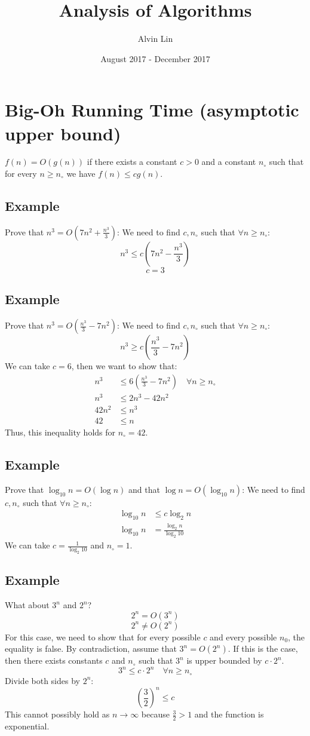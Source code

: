 \documentclass[letterpaper, 12pt]{math}
\title{Analysis of Algorithms}
\author{Alvin Lin}
\date{August 2017 - December 2017}
\begin{document}
\maketitle

\section*{Big-Oh Running Time (asymptotic upper bound)}
\( f(n) = O(g(n)) \) if there exists a constant \( c > 0 \) and a constant
\( n_{\circ} \) such that for every \( n\geq n_{\circ} \) we have
\( f(n)\leq cg(n) \).

\subsection*{Example}
Prove that \( n^3 = O(7n^2+\frac{n^3}{3}) \):
We need to find \( c,n_{\circ} \) such that \( \forall n\geq n_{\circ} \):
\[ n^3\leq c(7n^2-\frac{n^3}{3}) \]
\[ c = 3 \]

\subsection*{Example}
Prove that \( n^3 = O(\frac{n^3}{3}-7n^2) \):
We need to find \( c,n_{\circ} \) such that \( \forall n\geq n_{\circ} \):
\[ n^3\geq c(\frac{n^3}{3}-7n^2) \]
We can take \( c = 6 \), then we want to show that:
\begin{align*}
  n^3 &\leq 6(\frac{n^3}{3}-7n^2) \quad \forall n\geq n_{\circ} \\
  n^3 &\leq 2n^3-42n^2 \\
  42n^2 &\leq n^3 \\
  42 &\leq n
\end{align*}
Thus, this inequality holds for \( n_{\circ} = 42 \).

\subsection*{Example}
Prove that \( \log_{10}n = O(\log n) \) and that \( \log n = O(\log_{10}n) \):
We need to find \( c,n_{\circ} \) such that \( \forall n\geq n_{\circ} \):
\begin{align*}
  \log_{10}n &\leq c\log_{2}n \\
  \log_{10}n &= \frac{\log_{2}n}{\log_{2}10}
\end{align*}
We can take \( c = \frac{1}{\log_{2}10} \) and \( n_{\circ} = 1 \).

\subsection*{Example}
What about \( 3^n \) and \( 2^n \)?
\[ 2^n = O(3^n) \]
\[ 2^n \neq O(2^n) \]
For this case, we need to show that for every possible \( c \) and every
possible \( n_{0} \), the equality is false. By contradiction, assume that
\( 3^n = O(2^n) \). If this is the case, then there exists constants \( c \)
and \( n_{\circ} \) such that \( 3^n \) is upper bounded by \( c\cdot2^n \).
\[ 3^n \leq c\cdot2^n \quad \forall n\geq n_{\circ} \]
Divide both sides by \( 2^n \):
\[ (\frac{3}{2})^n \leq c \]
This cannot possibly hold as \( n\to\infty \) because \( \frac{3}{2} > 1 \)
and the function is exponential.
\end{document}
